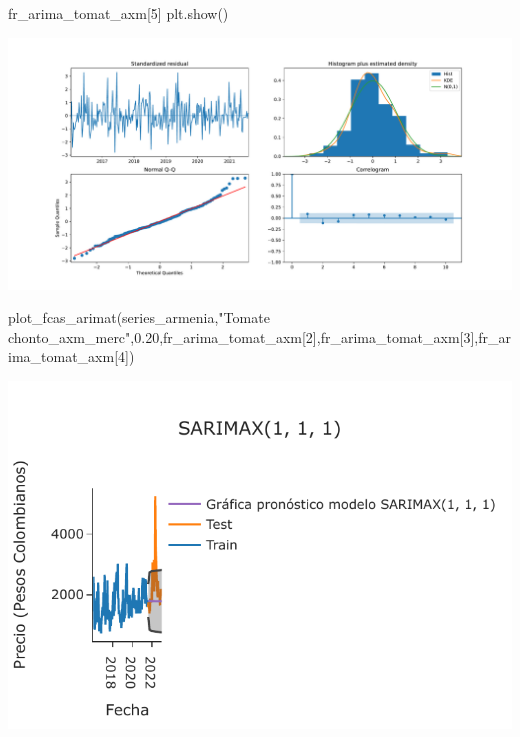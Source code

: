 \documentclass[
]{book}
\newenvironment{Shaded}{\begin{snugshade}}{\end{snugshade}}
\newcommand{\DecValTok}[1]{\textcolor[rgb]{0.00,0.00,0.81}{#1}}
\newcommand{\FloatTok}[1]{\textcolor[rgb]{0.00,0.00,0.81}{#1}}
\newcommand{\NormalTok}[1]{#1}
\newcommand{\StringTok}[1]{\textcolor[rgb]{0.31,0.60,0.02}{#1}}
\begin{document}
\begin{Shaded}
\begin{Highlighting}[]
\NormalTok{fr\_arima\_tomat\_axm[}\DecValTok{5}\NormalTok{]}
\NormalTok{plt.show()}
\end{Highlighting}
\end{Shaded}

\includegraphics{bookdown-demo_files/figure-latex/unnamed-chunk-157-147.pdf}

\begin{Shaded}
\begin{Highlighting}[]

\NormalTok{plot\_fcas\_arimat(series\_armenia,}\StringTok{"Tomate chonto\_axm\_merc"}\NormalTok{,}\FloatTok{0.20}\NormalTok{,fr\_arima\_tomat\_axm[}\DecValTok{2}\NormalTok{],fr\_arima\_tomat\_axm[}\DecValTok{3}\NormalTok{],fr\_arima\_tomat\_axm[}\DecValTok{4}\NormalTok{])}
\end{Highlighting}
\end{Shaded}

\includegraphics{bookdown-demo_files/figure-latex/unnamed-chunk-158-149.pdf}
\end{document}
